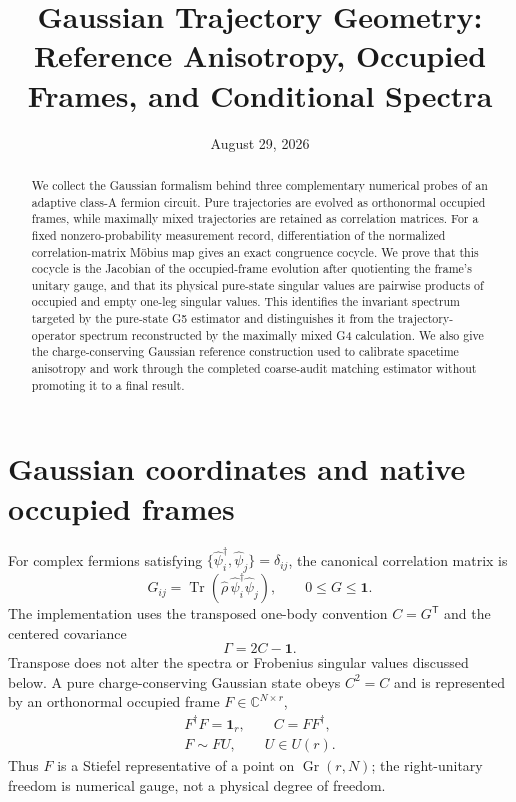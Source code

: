 \documentclass[aps,prx,twocolumn,superscriptaddress,longbibliography,nofootinbib,floatfix]{revtex4-2}
\newcommand{\Id}{\mathbf{1}}
\newcommand{\Tr}{\operatorname{Tr}}
\begin{document}
\title{Gaussian Trajectory Geometry: Reference Anisotropy, Occupied Frames, and Conditional Spectra}
\date{August 29, 2026}

\begin{abstract}
We collect the Gaussian formalism behind three complementary numerical probes of an
adaptive class-A fermion circuit.  Pure trajectories are evolved as orthonormal occupied
frames, while maximally mixed trajectories are retained as correlation matrices.  For a
fixed nonzero-probability measurement record, differentiation of the normalized
correlation-matrix M\"obius map gives an exact congruence cocycle.  We prove that this
cocycle is the Jacobian of the occupied-frame evolution after quotienting the frame's
unitary gauge, and that its physical pure-state singular values are pairwise products of
occupied and empty one-leg singular values.  This identifies the invariant spectrum
targeted by the pure-state G5 estimator and distinguishes it from the trajectory-operator
spectrum reconstructed by the maximally mixed G4 calculation.  We also give the
charge-conserving Gaussian reference construction used to calibrate spacetime anisotropy
and work through the completed coarse-audit matching estimator without promoting it to a
final result.
\end{abstract}

\maketitle

\section{Gaussian coordinates and native occupied frames}

For complex fermions satisfying
$\{\hat\psi_i^\dagger,\hat\psi_j\}=\delta_{ij}$, the canonical correlation
matrix is
\begin{equation}
 G_{ij}=\Tr(\hat\rho\,\hat\psi_i^\dagger\hat\psi_j),
 \qquad 0\leq G\leq\Id .
 \label{eq:canonical-G}
\end{equation}
The implementation uses the transposed one-body convention
$C=G^{\mathsf T}$ and the centered covariance
\begin{equation}
 \Gamma=2C-\Id .
 \label{eq:centered}
\end{equation}
Transpose does not alter the spectra or Frobenius singular values discussed below.
A pure charge-conserving Gaussian state obeys $C^2=C$ and is represented by an
orthonormal occupied frame $F\in\mathbb C^{N\times r}$,
\begin{equation}
 \begin{gathered}
 F^\dagger F=\Id_r,\qquad C=FF^\dagger,\\
 F\sim FU,\qquad U\in U(r).
 \end{gathered}
 \label{eq:frame}
\end{equation}
Thus $F$ is a Stiefel representative of a point on $\operatorname{Gr}(r,N)$;
the right-unitary freedom is numerical gauge, not a physical degree of freedom.
\end{document}
